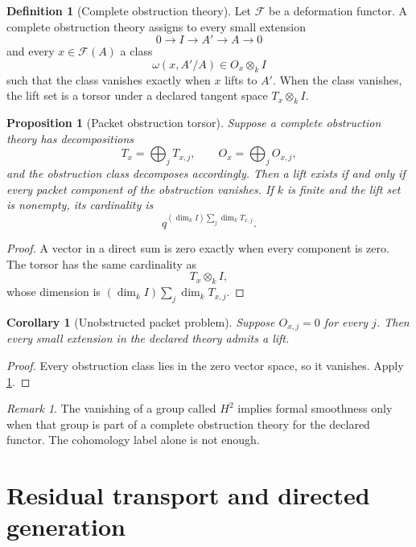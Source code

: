 \documentclass{aomart}
\newtheorem{proposition}[proposition]{Proposition}
\newtheorem{corollary}[corollary]{Corollary}
\theoremstyle{definition}
\newtheorem{definition}[definition]{Definition}
\theoremstyle{remark}
\newtheorem{remark}[remark]{Remark}
\newcommand{\calF}{\mathcal F}
\begin{document}
\begin{definition}[Complete obstruction theory]\label{def:complete_obstruction_theory}
Let \(\calF\) be a deformation functor. A complete obstruction theory assigns to every small extension
\[
0\longrightarrow I\longrightarrow A'\longrightarrow A\longrightarrow0
\]
and every \(x\in\calF(A)\) a class
\[
\omega(x,A'/A)\in O_x\otimes_kI
\]
such that the class vanishes exactly when \(x\) lifts to \(A'\). When the class vanishes, the lift set is a torsor under a declared tangent space \(T_x\otimes_kI\).
\end{definition}

\begin{proposition}[Packet obstruction torsor]\label{prop:packet_obstruction_torsor}
Suppose a complete obstruction theory has decompositions
\[
T_x=\bigoplus_jT_{x,j},
\qquad
O_x=\bigoplus_jO_{x,j},
\]
and the obstruction class decomposes accordingly. Then a lift exists if and only if every packet component of the obstruction vanishes. If \(k\) is finite and the lift set is nonempty, its cardinality is
\[
\boxed{
q^{(\dim_kI)\sum_j\dim_kT_{x,j}}.
}
\]
\end{proposition}

\begin{proof}
A vector in a direct sum is zero exactly when every component is zero. The torsor has the same cardinality as
\[
T_x\otimes_kI,
\]
whose dimension is \((\dim_kI)\sum_j\dim_kT_{x,j}\).
\end{proof}

\begin{corollary}[Unobstructed packet problem]\label{cor:unobstructed_packet}
Suppose \(O_{x,j}=0\) for every \(j\). Then every small extension in the declared theory admits a lift.
\end{corollary}

\begin{proof}
Every obstruction class lies in the zero vector space, so it vanishes. Apply \cref{def:complete_obstruction_theory}.
\end{proof}

\begin{remark}\label{rem:h2_boundary}
The vanishing of a group called \(H^2\) implies formal smoothness only when that group is part of a complete obstruction theory for the declared functor. The cohomology label alone is not enough.
\end{remark}

\section{Residual transport and directed generation}\label{sec:transport}
\end{document}
